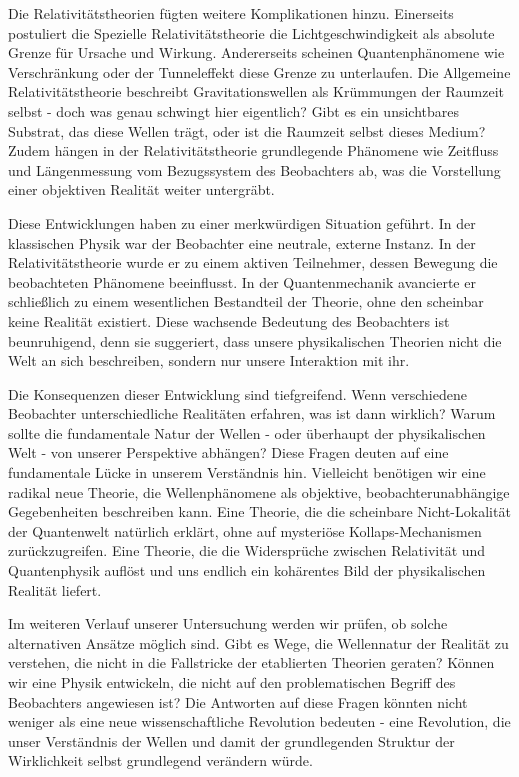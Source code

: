 Die Relativitätstheorien fügten weitere Komplikationen hinzu. Einerseits postuliert die Spezielle Relativitätstheorie die Lichtgeschwindigkeit als absolute Grenze für Ursache und Wirkung.
Andererseits scheinen Quantenphänomene wie Verschränkung oder der Tunneleffekt diese Grenze zu unterlaufen. Die Allgemeine Relativitätstheorie beschreibt Gravitationswellen als Krümmungen
der Raumzeit selbst - doch was genau schwingt hier eigentlich? Gibt es ein unsichtbares Substrat, das diese Wellen trägt, oder ist die Raumzeit selbst dieses Medium? Zudem hängen in der
Relativitätstheorie grundlegende Phänomene wie Zeitfluss und Längenmessung vom Bezugssystem des Beobachters ab, was die Vorstellung einer objektiven Realität weiter untergräbt.

Diese Entwicklungen haben zu einer merkwürdigen Situation geführt. In der klassischen Physik war der Beobachter eine neutrale, externe Instanz. In der Relativitätstheorie wurde er zu einem
aktiven Teilnehmer, dessen Bewegung die beobachteten Phänomene beeinflusst. In der Quantenmechanik avancierte er schließlich zu einem wesentlichen Bestandteil der Theorie, ohne den scheinbar
keine Realität existiert. Diese wachsende Bedeutung des Beobachters ist beunruhigend, denn sie suggeriert, dass unsere physikalischen Theorien nicht die Welt an sich beschreiben, sondern
nur unsere Interaktion mit ihr.

Die Konsequenzen dieser Entwicklung sind tiefgreifend. Wenn verschiedene Beobachter unterschiedliche Realitäten erfahren, was ist dann wirklich? Warum sollte die fundamentale Natur
der Wellen - oder überhaupt der physikalischen Welt - von unserer Perspektive abhängen? Diese Fragen deuten auf eine fundamentale Lücke in unserem Verständnis hin. Vielleicht benötigen
wir eine radikal neue Theorie, die Wellenphänomene als objektive, beobachterunabhängige Gegebenheiten beschreiben kann. Eine Theorie, die die scheinbare Nicht-Lokalität der Quantenwelt
natürlich erklärt, ohne auf mysteriöse Kollaps-Mechanismen zurückzugreifen. Eine Theorie, die die Widersprüche zwischen Relativität und Quantenphysik auflöst und uns endlich ein kohärentes
Bild der physikalischen Realität liefert.

Im weiteren Verlauf unserer Untersuchung werden wir prüfen, ob solche alternativen Ansätze möglich sind. Gibt es Wege, die Wellennatur der Realität zu verstehen, die nicht in die
Fallstricke der etablierten Theorien geraten? Können wir eine Physik entwickeln, die nicht auf den problematischen Begriff des Beobachters angewiesen ist? Die Antworten auf diese Fragen
könnten nicht weniger als eine neue wissenschaftliche Revolution bedeuten - eine Revolution, die unser Verständnis der Wellen und damit der grundlegenden Struktur der Wirklichkeit selbst
grundlegend verändern würde.

